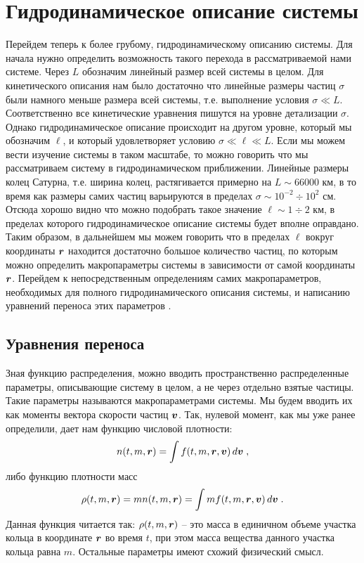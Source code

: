 \chapter{Гидродинамическое описание системы}
\label{cha:design}

Перейдем теперь к более грубому, гидродинамическому описанию системы. Для начала нужно определить возможность такого перехода
в рассматриваемой нами системе. Через $L$ обозначим линейный размер всей системы в целом. Для кинетического описания нам было достаточно
что линейные размеры частиц $\sigma$ были намного меньше размера всей системы, т.е. выполнение условия $\sigma\ll L$. Соответственно
все кинетические уравнения пишутся на уровне детализации $\sigma$. Однако гидродинамическое описание происходит на другом уровне,
который мы обозначим $\ell$, и который удовлетворяет условию $\sigma\ll\ell\ll L$. Если мы можем вести изучение системы в таком масштабе,
то можно говорить что мы рассматриваем систему в гидродинамическом приближении. Линейные размеры колец Сатурна, т.е. ширина колец,
растягивается примерно на $L\sim 66 000$ км, в то время как размеры самих частиц варьируются в пределах $\sigma\sim 10^{-2}\div 10^2$ см.
Отсюда хорошо видно что можно подобрать такое значение $\ell\sim 1\div 2$ км, в пределах которого гидродинамическое описание системы
будет вполне оправдано. Таким образом, в дальнейшем мы можем говорить что в пределах $\ell$ вокруг координаты $\bm{r}$ находится достаточно большое
количество частиц, по которым можно определить макропараметры системы в зависимости от самой координаты $\bm{r}$. Перейдем к непосредственным 
определениям самих макропараметров, необходимых для полного гидродинамического описания системы, и написанию уравнений переноса
этих параметров \cite{Hoffmann:2013astrolett_vertical_relax,Spahn:2006gamm_hydro_rings}.

\section{Уравнения переноса}

Зная функцию распределения, можно вводить пространственно распределенные параметры, описывающие систему в целом, а не через отдельно
взятые частицы. Такие параметры называются макропараметрами системы. Мы будем вводить их как моменты вектора скорости частиц $\bm{v}$. Так,
нулевой момент, как мы уже ранее определили, дает нам функцию числовой плотности:
\begin{equation}
  n(t,m,\bm{r}) = \int f(t,m,\bm{r},\bm{v})\,d\bm{v}\;,
\end{equation}
либо функцию плотности масс
\begin{equation}\label{eq:mass_density}
  \rho(t,m,\bm{r}) = mn(t,m,\bm{r}) = \int mf(t,m,\bm{r},\bm{v})\,d\bm{v}\;.
\end{equation}
Данная функция читается так: $\rho(t,m,\bm{r})$ -- это масса в единичном объеме участка кольца в координате $\bm{r}$ во время $t$, при этом 
масса вещества данного участка кольца равна $m$. Остальные параметры имеют схожий физический смысл.

